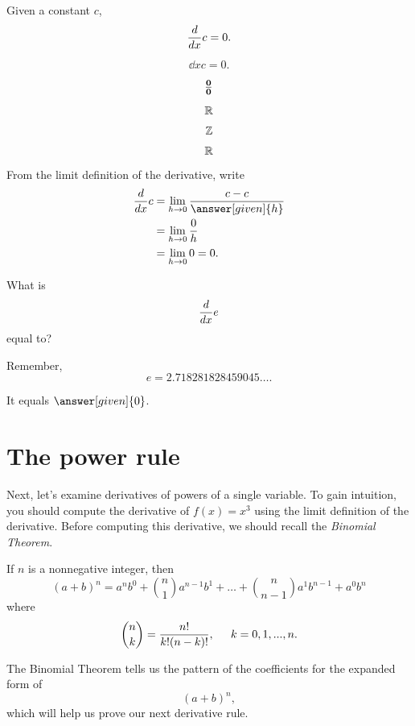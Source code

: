 \documentclass{ximera}
\begin{document}
\begin{theorem}
Given a constant $c$,
\[
 \frac{d}{\mathop{}\!d x} c = 0.
 \]
 
 \[
 \dd{x} c = 0.
 \]
 
 \[
 \boldsymbol{\tfrac{0}{0}}
 \]
 
 
  \[
 \mathbb R
 \]
 
 
 \[
 \mathbb Z
 \]
 

 
 
 \mooculus
 
 
 \[
 \mathbb R 
 \]
 
 
 
 

\begin{explanation}
From the limit definition of the derivative, write
\begin{align*}
\ddx c &= \lim_{h\to 0}\frac{c-c}{\answer[given]{h}}\\
&= \lim_{h\to 0} \frac{0}{h}\\
&= \lim_{h\to 0} 0 = 0.
\end{align*}
\end{explanation}
\end{theorem}

\begin{question}
  What is
  \[
  \frac{d}{\mathop{}\!d x} e
  \]
  equal to?
  \begin{hint}
    Remember,
    \[
    e = 2.718281828459045\dots.
    \]
  \end{hint}
  \begin{prompt}
    It equals $\answer[given]{0}$.
  \end{prompt}
\end{question}


\section{The power rule}

Next, let's examine derivatives of powers of a single variable. 
To gain intuition, you should compute the
derivative of $f(x) = x^3$ using the limit definition of the
derivative. Before computing this derivative, we should recall 
the \textit{Binomial Theorem}.

\begin{theorem}
If $n$ is a nonnegative integer, then
\[
(a+b)^n = a^nb^0 + \binom{n}{1} a^{n-1}b^1 + \dots + \binom{n}{n-1} a^{1}b^{n-1} +  a^{0}b^n   
\]
where
\[
\binom{n}{k} = \frac{n!}{k!(n-k)!}, \hspace{0.2in}k=0,1,...,n.
\]
\end{theorem}
The Binomial Theorem tells us the pattern of the coefficients for the
expanded form of
\[
(a+b)^n,
\]
which will help us prove our next derivative rule.
\end{document}
